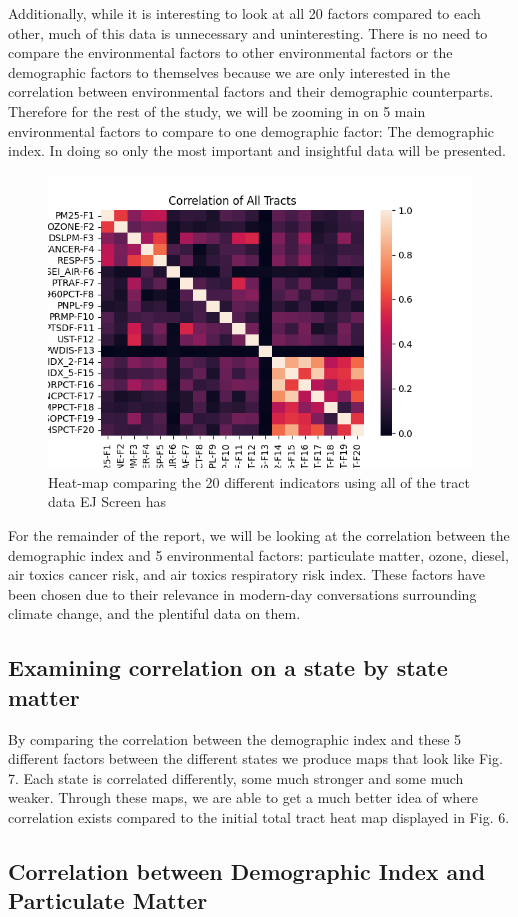 \documentclass[letterpaper, 10 pt, conference]{ieeeconf}  %
\begin{document}
Additionally, while it is interesting to look at all 20 factors compared to each other, much of this data is unnecessary and uninteresting. There is no need to compare the environmental factors to other environmental factors or the demographic factors to themselves because we are only interested in the correlation between environmental factors and their demographic counterparts. Therefore for the rest of the study, we will be zooming in on 5 main environmental factors to compare to one demographic factor: The demographic index. In doing so only the most important and insightful data will be presented. \par
\begin{figure}
    \centering
    \includegraphics[width=0.5\linewidth]{Images/TotalTracts.png}
    \caption{Heat-map comparing the 20 different indicators using all of the tract data EJ Screen has}
    \label{fig:enter-label}
\end{figure}
For the remainder of the report, we will be looking at the correlation between the demographic index and 5 environmental factors: particulate matter, ozone, diesel, air toxics cancer risk, and air toxics respiratory risk index. These factors have been chosen due to their relevance in modern-day conversations surrounding climate change, and the plentiful data on them.\par

\subsection{Examining correlation on a state by state matter}

By comparing the correlation between the demographic index and these 5 different factors between the different states we produce maps that look like Fig. 7. Each state is correlated differently, some much stronger and some much weaker. Through these maps, we are able to get a much better idea of where correlation exists compared to the initial total tract heat map displayed in Fig. 6. \par
\subsection{Correlation between Demographic Index and Particulate Matter}
\end{document}
